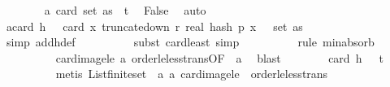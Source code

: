 \begin{isabellebody}
\ \ \ \ \ \ \isamarkupfalse%
\ a{\isacharunderscore}{\kern0pt}{}{\isacharcolon}{\kern0pt}\ {\isachardoublequoteopen}card\ {\isacharparenleft}{\kern0pt}set\ as{\isacharparenright}{\kern0pt}\ {\isacharless}{\kern0pt}\ t{\isachardoublequoteclose}\ \isamarkupfalse%
\ False\ \isamarkupfalse%
\ auto\isanewline
\ \ \ \ \ \ \isamarkupfalse%
\ a{\isacharunderscore}{\kern0pt}{}{\isacharcolon}{\kern0pt}{\isachardoublequoteopen}card\ {\isacharparenleft}{\kern0pt}h\ {\isasymomega}{\isacharparenright}{\kern0pt}\ {\isacharequal}{\kern0pt}\ card\ {\isacharparenleft}{\kern0pt}{\isacharparenleft}{\kern0pt}{\isasymlambda}x{\isachardot}{\kern0pt}\ truncate{\isacharunderscore}{\kern0pt}down\ r\ {\isacharparenleft}{\kern0pt}real\ {\isacharparenleft}{\kern0pt}hash\ p\ x\ {\isasymomega}{\isacharparenright}{\kern0pt}{\isacharparenright}{\kern0pt}{\isacharparenright}{\kern0pt}\ {\isacharbackquote}{\kern0pt}\ {\isacharparenleft}{\kern0pt}set\ as{\isacharparenright}{\kern0pt}{\isacharparenright}{\kern0pt}{\isachardoublequoteclose}\isanewline
\ \ \ \ \ \ \ \ \isamarkupfalse%
\ {\isacharparenleft}{\kern0pt}simp\ add{\isacharcolon}{\kern0pt}h{\isacharunderscore}{\kern0pt}def{\isacharparenright}{\kern0pt}\isanewline
\ \ \ \ \ \ \ \ \isamarkupfalse%
\ {\isacharparenleft}{\kern0pt}subst\ card{\isacharunderscore}{\kern0pt}least{\isacharcomma}{\kern0pt}\ simp{\isacharparenright}{\kern0pt}\isanewline
\ \ \ \ \ \ \ \ \isamarkupfalse%
\ {\isacharparenleft}{\kern0pt}rule\ min{\isachardot}{\kern0pt}absorb{}{\isacharparenright}{\kern0pt}\isanewline
\ \ \ \ \ \ \ \ \isamarkupfalse%
\ card{\isacharunderscore}{\kern0pt}image{\isacharunderscore}{\kern0pt}le\ a{\isacharunderscore}{\kern0pt}{}\ order{\isacharunderscore}{\kern0pt}le{\isacharunderscore}{\kern0pt}less{\isacharunderscore}{\kern0pt}trans{\isacharbrackleft}{\kern0pt}OF\ {\isacharunderscore}{\kern0pt}\ a{\isacharunderscore}{\kern0pt}{}{\isacharbrackright}{\kern0pt}\ \isamarkupfalse%
\ blast\isanewline
\ \ \ \ \ \ \isamarkupfalse%
\ {\isachardoublequoteopen}card\ {\isacharparenleft}{\kern0pt}h\ {\isasymomega}{\isacharparenright}{\kern0pt}\ {\isacharless}{\kern0pt}\ t{\isachardoublequoteclose}\isanewline
\ \ \ \ \ \ \ \ \isamarkupfalse%
\ {\isacharparenleft}{\kern0pt}metis\ List{\isachardot}{\kern0pt}finite{\isacharunderscore}{\kern0pt}set\ \ a{\isacharunderscore}{\kern0pt}{}\ a{\isacharunderscore}{\kern0pt}{}\ card{\isacharunderscore}{\kern0pt}image{\isacharunderscore}{\kern0pt}le\ \ order{\isacharunderscore}{\kern0pt}le{\isacharunderscore}{\kern0pt}less{\isacharunderscore}{\kern0pt}trans{\isacharparenright}{\kern0pt}\isanewline

\end{isabellebody}
